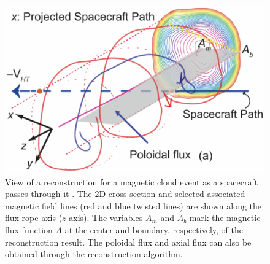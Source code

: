 \begin{figure}[ht!]
    \centering
    \includegraphics[width=\textwidth]{Figures/Hu2017_5a.png}
    \caption[Representation of a 2D cross-sectional view of a magnetic cloud] {View of a reconstruction for a magnetic cloud event as a spacecraft passes through it \citep{Hu:2017}. The 2D cross section and selected associated magnetic field lines (red and blue twisted lines) are shown along the flux rope axis ($z$-axis). The variables $A_m$ and $A_b$ mark the magnetic flux function $A$ at the center and boundary, respectively, of the reconstruction result. The poloidal flux and axial flux can also be obtained through the reconstruction algorithm.} %
    \label{fig:GSreconstruction_Hu2017}
\end{figure}

